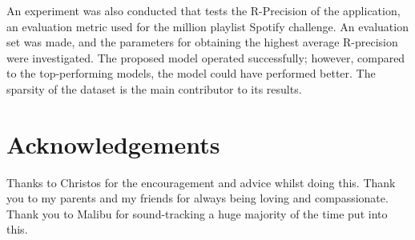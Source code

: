 An experiment was also conducted that tests the R-Precision of the application, an evaluation metric used for the million playlist Spotify challenge. An evaluation set was made, and the parameters for obtaining the highest average R-precision were investigated. The proposed model operated successfully; however, compared to the top-performing models, the model could have performed better. The sparsity of the dataset is the main contributor to its results.

\frontmatter

\singlespacing

\setlength{\parskip}{0ex} %

\clearpage
{}
\tableofcontents
\clearpage
{}
{}
\listoffigures
\clearpage
{}



\setlength{\parskip}{1ex plus 0.2ex minus 0.2ex} %

\onehalfspacing

\chapter{Acknowledgements}

Thanks to Christos for the encouragement and advice whilst doing this. Thank you to my parents and my friends for always being loving and compassionate. Thank you to Malibu for sound-tracking a huge majority of the time put into this.